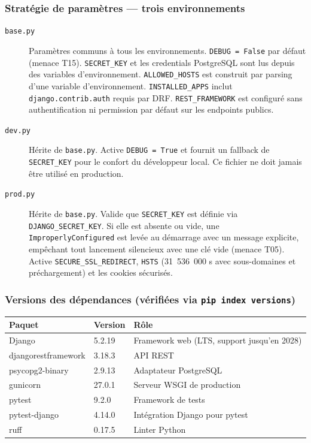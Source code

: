\documentclass[11pt,a4paper]{article}
\begin{document}
\subsubsection*{Stratégie de paramètres --- trois environnements}

\begin{description}
  \item[\texttt{base.py}] Paramètres communs à tous les environnements.
    \texttt{DEBUG = False} par défaut (menace T15). \texttt{SECRET\_KEY} et les credentials
    PostgreSQL sont lus depuis des variables d'environnement. \texttt{ALLOWED\_HOSTS} est
    construit par parsing d'une variable d'environnement. \texttt{INSTALLED\_APPS} inclut
    \texttt{django.contrib.auth} requis par DRF. \texttt{REST\_FRAMEWORK} est configuré
    sans authentification ni permission par défaut sur les endpoints publics.

  \item[\texttt{dev.py}] Hérite de \texttt{base.py}. Active \texttt{DEBUG = True} et fournit
    un fallback de \texttt{SECRET\_KEY} pour le confort du développeur local. Ce fichier
    ne doit jamais être utilisé en production.

  \item[\texttt{prod.py}] Hérite de \texttt{base.py}. Valide que \texttt{SECRET\_KEY} est
    définie via \texttt{DJANGO\_SECRET\_KEY}. Si elle est absente ou vide, une
    \texttt{ImproperlyConfigured} est levée au démarrage avec un message explicite,
    empêchant tout lancement silencieux avec une clé vide (menace T05). Active
    \texttt{SECURE\_SSL\_REDIRECT}, \texttt{HSTS} (31~536~000 s avec sous-domaines et
    préchargement) et les cookies sécurisés.
\end{description}

\subsubsection*{Versions des dépendances (vérifiées via \texttt{pip index versions})}

\begin{center}
\renewcommand{\arraystretch}{1.3}
\begin{tabular}{lll}
  \toprule
  \textbf{Paquet} & \textbf{Version} & \textbf{Rôle} \\
  \midrule
  Django              & 5.2.19 & Framework web (LTS, support jusqu'en 2028) \\
  djangorestframework & 3.18.3 & API REST \\
  psycopg2-binary     & 2.9.13 & Adaptateur PostgreSQL \\
  gunicorn            & 27.0.1 & Serveur WSGI de production \\
  pytest              & 9.2.0  & Framework de tests \\
  pytest-django       & 4.14.0 & Intégration Django pour pytest \\
  ruff                & 0.17.5 & Linter Python \\
  \bottomrule
\end{tabular}
\end{center}
\end{document}
